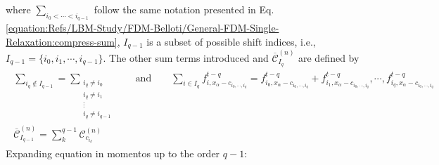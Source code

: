 \documentclass[letterpaper,10pt,english,openany,oneside]{jupyterBook}
\begin{document}
\sphinxAtStartPar
where \(\displaystyle\sum_{i_{0}<\cdots <i_{q-1}}\) follow the same notation presented in Eq. \eqref{equation:Refs/LBM-Study/FDM-Belloti/General-FDM-Single-Relaxation:compress-sum}, \(I_{q-1}\) is a subset of possible shift indices, i.e., \(I_{q-1}=\{i_{0},i_{1},\cdots,i_{q-1}\}\). The other sum terms introduced and \(\overline{\mathcal{C}}_{I_{q}}^{(n)}\) are defined by
\begin{equation*}
\begin{split}
\begin{array}{c}
\displaystyle\sum_{i_{q}\notin I_{q-1}}=\sum_{\substack{i_{q}\ne i_{0}\\ i_{q}\ne i_{1}\\ \vdots \\ i_{q}\ne i_{q-1}}} 
\qquad \textrm{and} \qquad \sum_{i \in I_{q}} f_{i,x_{\alpha}-c_{i_{0},\cdots,i_{q}}}^{t-q} = f_{i_{0},x_{\alpha}-c_{i_{0},\cdots,i_{q}}}^{t-q} + f_{i_{1},x_{\alpha}-c_{i_{0},\cdots,i_{q}}}^{t-q}, \cdots, f_{i_{q},x_{\alpha}-c_{i_{0},\cdots,i_{q}}}^{t-q} \\
\overline{\mathcal{C}}_{I_{q-1}}^{(n)} = \displaystyle\sum_{k}^{q-1} \mathcal{C}_{c_{i_{k}}}^{(n)} 
\end{array}
\end{split}
\end{equation*}
\sphinxAtStartPar
Expanding equation in momentos up to the order \(q-1\):
\end{document}
